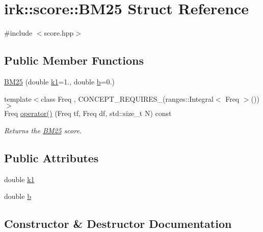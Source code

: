 \hypertarget{structirk_1_1score_1_1BM25}{}\section{irk\+:\+:score\+:\+:B\+M25 Struct Reference}
\label{structirk_1_1score_1_1BM25}


{\ttfamily \#include $<$score.\+hpp$>$}

\subsection*{Public Member Functions}
\begin{DoxyCompactItemize}
\item 
\mbox{\hyperlink{structirk_1_1score_1_1BM25_ac1125e07e79150a38496100c76a01849}{B\+M25}} (double \mbox{\hyperlink{structirk_1_1score_1_1BM25_a29a294777cb1b8034abd2b37f70a1d0a}{k1}}=1., double \mbox{\hyperlink{structirk_1_1score_1_1BM25_ac6585ade6f9f049fda74c625a5f4747c}{b}}=0.)
\item 
{\footnotesize template$<$class Freq , C\+O\+N\+C\+E\+P\+T\+\_\+\+R\+E\+Q\+U\+I\+R\+E\+S\+\_\+(ranges\+::\+Integral$<$ Freq $>$()) $>$ }\\Freq \mbox{\hyperlink{structirk_1_1score_1_1BM25_aab199588e53528b5e8426f6f8b9c237a}{operator()}} (Freq tf, Freq df, std\+::size\+\_\+t N) const
\begin{DoxyCompactList}\small\item\em Returns the \mbox{\hyperlink{structirk_1_1score_1_1BM25}{B\+M25}} score. \end{DoxyCompactList}\end{DoxyCompactItemize}
\subsection*{Public Attributes}
\begin{DoxyCompactItemize}
\item 
double \mbox{\hyperlink{structirk_1_1score_1_1BM25_a29a294777cb1b8034abd2b37f70a1d0a}{k1}}
\item 
double \mbox{\hyperlink{structirk_1_1score_1_1BM25_ac6585ade6f9f049fda74c625a5f4747c}{b}}
\end{DoxyCompactItemize}


\subsection{Constructor \& Destructor Documentation}
\mbox{\label{structirk_1_1score_1_1BM25_ac1125e07e79150a38496100c76a01849}} 
